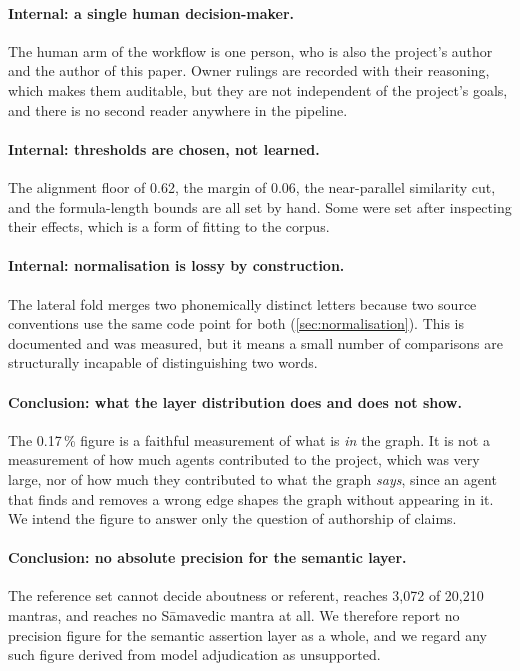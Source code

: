 \paragraph{Internal: a single human decision-maker.} The human arm of the workflow is
one person, who is also the project's author and the author of this paper. Owner
rulings are recorded with their reasoning, which makes them auditable, but they are
not independent of the project's goals, and there is no second reader anywhere in the
pipeline.

\paragraph{Internal: thresholds are chosen, not learned.} The alignment floor of
0.62, the margin of 0.06, the near-parallel similarity cut, and the formula-length
bounds are all set by hand. Some were set after inspecting their effects, which is a
form of fitting to the corpus.

\paragraph{Internal: normalisation is lossy by construction.} The lateral fold merges
two phonemically distinct letters because two source conventions use the same code
point for both (\cref{sec:normalisation}). This is documented and was measured, but
it means a small number of comparisons are structurally incapable of distinguishing
two words.

\paragraph{Conclusion: what the layer distribution does and does not show.} The
0.17\,\% figure is a faithful measurement of what is \emph{in} the graph. It is not a
measurement of how much agents contributed to the project, which was very large, nor
of how much they contributed to what the graph \emph{says}, since an agent that finds
and removes a wrong edge shapes the graph without appearing in it. We intend the
figure to answer only the question of authorship of claims.

\paragraph{Conclusion: no absolute precision for the semantic layer.} The reference
set cannot decide aboutness or referent, reaches 3{,}072 of 20{,}210 mantras, and
reaches no S\=amavedic mantra at all. We therefore report no precision figure for the
semantic assertion layer as a whole, and we regard any such figure derived from
model adjudication as unsupported.

